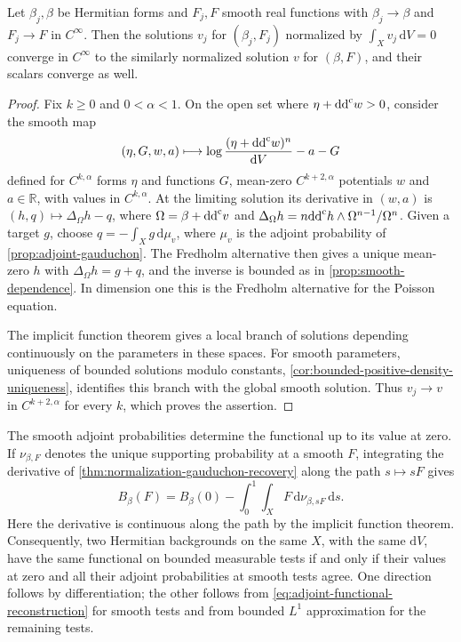 \begin{proposition}\label{prop:smooth-background-potential-stability}
Let $\beta_j,\beta$ be Hermitian forms and $F_j,F$ smooth real functions with $\beta_j\to\beta$ and $F_j\to F$ in $C^\infty$. Then the solutions $v_j$ for $(\beta_j,F_j)$ normalized by $\int_Xv_j\,\mathrm{d}V=0$ converge in $C^\infty$ to the similarly normalized solution $v$ for $(\beta,F)$, and their scalars converge as well.
\end{proposition}
\begin{proof}
Fix $k\geq0$ and $0<\alpha<1$. On the open set where $\eta+\mathrm{dd}^{\mathrm{c}} w>0$, consider the smooth map
\[
 (\eta,G,w,a)\longmapsto\log\frac{(\eta+\mathrm{dd}^{\mathrm{c}} w)^n}{\mathrm{d}V}-a-G
\]
defined for $C^{k,\alpha}$ forms $\eta$ and functions $G$, mean-zero $C^{k+2,\alpha}$ potentials $w$ and $a\in\mathbb R$, with values in $C^{k,\alpha}$. At the limiting solution its derivative in $(w,a)$ is $(h,q)\mapsto\Delta_\Omega h-q$, where $\Omega=\beta+\mathrm{dd}^{\mathrm{c}} v$ and $\Delta_\Omega h=n\mathrm{dd}^{\mathrm{c}} h\wedge\Omega^{n-1}/\Omega^n$. Given a target $g$, choose $q=-\int_Xg\,\mathrm{d}\mu_v$, where $\mu_v$ is the adjoint probability of \cref{prop:adjoint-gauduchon}. The Fredholm alternative then gives a unique mean-zero $h$ with $\Delta_\Omega h=g+q$, and the inverse is bounded as in \cref{prop:smooth-dependence}. In dimension one this is the Fredholm alternative for the Poisson equation.

The implicit function theorem gives a local branch of solutions depending continuously on the parameters in these spaces. For smooth parameters, uniqueness of bounded solutions modulo constants, \cref{cor:bounded-positive-density-uniqueness}, identifies this branch with the global smooth solution. Thus $v_j\to v$ in $C^{k+2,\alpha}$ for every $k$, which proves the assertion.
\end{proof}

The smooth adjoint probabilities determine the functional up to its value at zero. If $\nu_{\beta,F}$ denotes the unique supporting probability at a smooth $F$, integrating the derivative of \cref{thm:normalization-gauduchon-recovery} along the path $s\mapsto sF$ gives
\begin{equation}\label{eq:adjoint-functional-reconstruction}
 B_\beta(F)=B_\beta(0)-\int_0^1\!\int_XF\,\mathrm{d}\nu_{\beta,sF}\,\mathrm{d}s.
\end{equation}
Here the derivative is continuous along the path by the implicit function theorem. Consequently, two Hermitian backgrounds on the same $X$, with the same $\mathrm{d}V$, have the same functional on bounded measurable tests if and only if their values at zero and all their adjoint probabilities at smooth tests agree. One direction follows by differentiation; the other follows from \eqref{eq:adjoint-functional-reconstruction} for smooth tests and from bounded $L^1$ approximation for the remaining tests.
